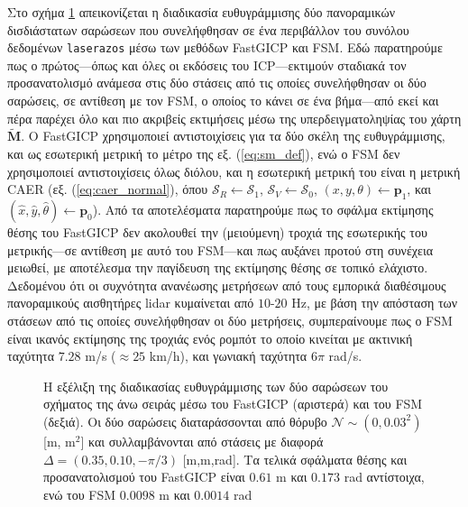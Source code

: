 Στο σχήμα \ref{fig:02_05_04:01} απεικονίζεται η διαδικασία ευθυγράμμισης δύο
πανοραμικών δισδιάστατων σαρώσεων που συνελήφθησαν σε ένα περιβάλλον του συνόλου
δεδομένων \texttt{laserazos} μέσω των μεθόδων FastGICP
και FSM.  Εδώ παρατηρούμε πως ο πρώτος---όπως και όλες οι εκδόσεις του
ICP---εκτιμούν σταδιακά τον προσανατολισμό ανάμεσα στις δύο στάσεις από τις
οποίες συνελήφθησαν οι δύο σαρώσεις, σε αντίθεση με τον FSM, ο οποίος το κάνει
σε ένα βήμα---από εκεί και πέρα παρέχει όλο και πιο ακριβείς εκτιμήσεις μέσω
της υπερδειγματοληψίας του χάρτη $\widetilde{\bm{M}}$. Ο FastGICP χρησιμοποιεί
αντιστοιχίσεις για τα δύο σκέλη της ευθυγράμμισης, και ως εσωτερική μετρική το
μέτρο της εξ. (\ref{eq:sm_def}), ενώ ο FSM δεν χρησιμοποιεί αντιστοιχίσεις
όλως διόλου, και η εσωτερική μετρική του είναι η μετρική CAER (εξ.
(\ref{eq:caer_normal}), όπου $\mathcal{S}_R \leftarrow \mathcal{S}_1$,
$\mathcal{S}_V \leftarrow \mathcal{S}_0$, $(x,y,\theta)\leftarrow\bm{p}_1$, και
$(\hat{x}, \hat{y}, \hat{\theta}) \leftarrow \bm{p}_0$). Από τα αποτελέσματα
παρατηρούμε πως το σφάλμα εκτίμησης θέσης του FastGICP δεν ακολουθεί την
(μειούμενη) τροχιά της εσωτερικής του μετρικής---σε αντίθεση με αυτό του
FSM---και πως αυξάνει προτού στη συνέχεια μειωθεί, με αποτέλεσμα την
παγίδευση της εκτίμησης θέσης σε τοπικό ελάχιστο. Δεδομένου ότι οι συχνότητα
ανανέωσης μετρήσεων από τους εμπορικά διαθέσιμους πανοραμικούς αισθητήρες lidar
κυμαίνεται από $10$-$20$ Hz, με βάση την απόσταση των στάσεων από τις οποίες
συνελήφθησαν οι δύο μετρήσεις, συμπεραίνουμε πως ο FSM είναι ικανός εκτίμησης
της τροχιάς ενός ρομπότ το οποίο κινείται με ακτινική ταχύτητα $7.28$ m/s
($\approx 25$ km/h), και γωνιακή ταχύτητα $6\pi$ rad/s.

\begin{figure}[]\centering
  
  \vspace{0.5cm}
  \caption{\small Η εξέλιξη της διαδικασίας ευθυγράμμισης των δύο σαρώσεων του
           σχήματος της άνω σειράς μέσω του FastGICP (αριστερά) και του
           FSM (δεξιά). Οι δύο σαρώσεις διαταράσσονται από θόρυβο
           $\mathcal{N} \sim (0, 0.03^2)$ [m, m$^2$] και συλλαμβάνονται από
           στάσεις με διαφορά $\Delta = (0.35, 0.10, -\pi/3)$ [m,m,rad].
           Τα τελικά σφάλματα θέσης και προσανατολισμού του FastGICP είναι
           $0.61$ m και $0.173$ rad αντίστοιχα, ενώ του FSM
           $0.0098$ m και $0.0014$ rad}
  \label{fig:02_05_04:01}
\end{figure}


